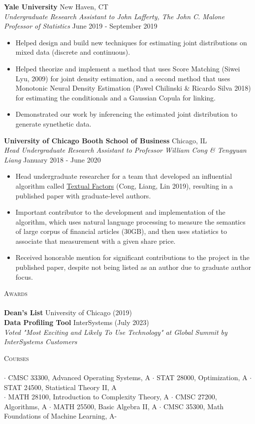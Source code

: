 \documentclass[a4paper]{article}
\newcommand{\lineunder} {
    \vspace*{-8pt} \\
    \hspace*{-18pt} \hrulefill \\
}
\newcommand{\header} [1] {
    {\hspace*{-18pt}\vspace*{6pt} \textsc{#1}}
    \vspace*{-6pt} \lineunder
}
\begin{document}
\textbf{Yale University} \hfill New Haven, CT\\
\textit{Undergraduate Research Assistant to John Lafferty, The John C. Malone Professor of Statistics} \hfill June 2019 - September 2019\\
\vspace{-1mm}
\begin{itemize} \itemsep 1pt
	\item Helped design and build new techniques for estimating joint distributions on mixed data (discrete and continuous).
	\item Helped theorize and implement a method that uses Score Matching (Siwei Lyu, 2009) for joint density estimation, and a second method that uses Monotonic Neural Density Estimation
	      (Pawel Chilinski \& Ricardo Silva 2018) for estimating the conditionals and a Gaussian Copula for linking.
	\item Demonstrated our work by inferencing the estimated joint distribution to generate synethetic data.
\end{itemize}
\textbf{University of Chicago Booth School of Business} \hfill Chicago, IL\\
\textit{Head Undergraduate Research Assistant to Professor William Cong \& Tengyuan Liang} \hfill January 2018 - June 2020\\
\vspace{-1mm}
\begin{itemize} \itemsep 1pt
	\item Head undergraduate researcher for a team that developed an influential algorithm called \href{https://papers.ssrn.com/sol3/papers.cfm?abstract_id=3307057}{Textual Factors} (Cong, Liang, Lin 2019), resulting in a published paper with graduate-level authors.
	\item Important contributor to the development and implementation of the algorithm, which uses natural language processing to measure the semantics of large corpus of financial articles (30GB), and then uses statistics to associate that measurement with a given share price.
	\item Received honorable mention for significant contributions to the project in the published paper, despite not being listed as an author due to graduate author focus.
\end{itemize}

\header{Awards}
\textbf{Dean’s List} \hfill University of Chicago (2019)\\
\textbf{Data Profiling Tool} \hfill InterSystems (July 2023) \\
\textit{Voted "Most Exciting and Likely To Use Technology" at Global Summit by InterSystems Customers}


\header{Courses}
$\cdot$ CMSC 33300, Advanced Operating Systems, A
$\cdot$ STAT 28000, Optimization, A
$\cdot$ STAT 24500, Statistical Theory II, A \\
$\cdot$ MATH 28100, Introduction to Complexity Theory, A
$\cdot$ CMSC 27200, Algorithms, A
$\cdot$ MATH 25500, Basic Algebra II, A
$\cdot$ CMSC 35300, Math Foundations of Machine Learning, A-
\end{document}
